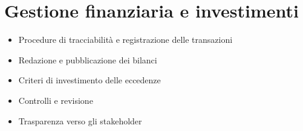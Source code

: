 
\section*{Gestione finanziaria e investimenti}

\begin{itemize}
  \item Procedure di tracciabilità e registrazione delle transazioni
  \item Redazione e pubblicazione dei bilanci
  \item Criteri di investimento delle eccedenze
  \item Controlli e revisione
  \item Trasparenza verso gli stakeholder
\end{itemize}

